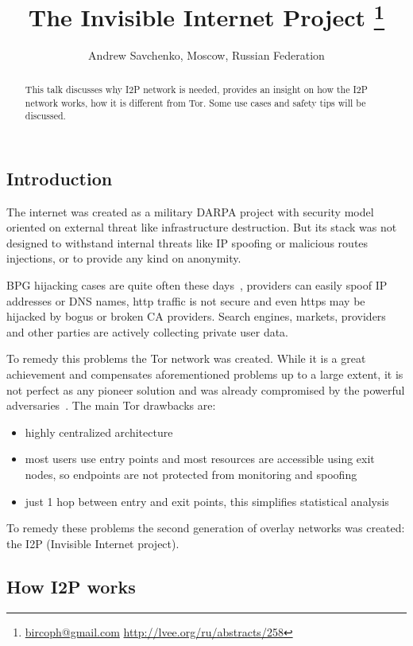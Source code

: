\documentclass[10pt, a5paper]{article}
\begin{document}
\title{The Invisible Internet Project
\footnote{\url{bircoph@gmail.com} \url{http://lvee.org/ru/abstracts/258}}}
\author{Andrew Savchenko, Moscow, Russian Federation}
\maketitle
\begin{abstract}
This talk discusses why I2P network is needed, provides an insight on how the I2P network works, how it is different from Tor. Some use cases and safety tips will be discussed.
\end{abstract}
\subsection*{Introduction}

The internet was created as a military DARPA project with security model oriented on external threat like infrastructure destruction. But its stack was not designed to withstand internal threats like IP spoofing or malicious routes injections, or to provide any kind on anonymity.

BPG hijacking cases are quite often these days~\cite{Savchenko-1}, providers can easily spoof IP addresses or DNS names, http traffic is not secure and even https may be hijacked by bogus or broken CA providers. Search engines, markets, providers and other parties are actively collecting private user data.

To remedy this problems the Tor network was created. While it is a great achievement and compensates aforementioned problems up to a large extent, it is not perfect as any pioneer solution and was already compromised by the powerful adversaries~\cite{Savchenko-2}. The main Tor drawbacks are:

\begin{itemize}
  \item highly centralized architecture
  \item most users use entry points and most resources are accessible using exit nodes, so endpoints are not protected from monitoring and spoofing
  \item just 1 hop between entry and exit points, this simplifies statistical analysis
\end{itemize}

To remedy these problems the second generation of overlay networks was created: the I2P (Invisible Internet project).

\subsection*{How I2P works}
\end{document}
